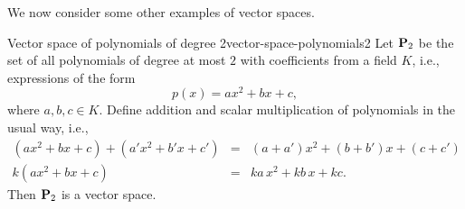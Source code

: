 We now consider some other examples of vector spaces.

\begin{example}{Vector space of polynomials of degree 2}{vector-space-polynomials2}
  Let $\mathbf{P}_2$%
   be the set of all polynomials%
   of degree at most $2$ with coefficients from a
  field $K$, i.e., expressions of the form
  \begin{equation*}
    p(x) = ax^2 + bx + c,
  \end{equation*}
  where $a,b,c\in K$. Define addition%
   and scalar multiplication%
   of polynomials in the
  usual way, i.e.,
  \begin{eqnarray*}
    (ax^2 + bx + c) + (a'x^2 + b'x + c') &=& (a + a')x^2 + (b + b')x + (c + c') \\
    k(ax^2 + bx + c) &=& ka\,x^2 + kb\,x + kc.
  \end{eqnarray*}
  Then $\mathbf{P}_2$ is a vector space.
\end{example}

